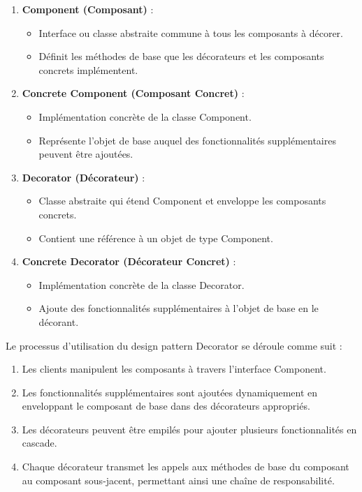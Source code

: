 \begin{enumerate}[leftmargin=*,labelsep=3mm]
    \item \textbf{Component (Composant)} :
    \begin{itemize}
        \item Interface ou classe abstraite commune à tous les composants à décorer.
        \item Définit les méthodes de base que les décorateurs et les composants concrets implémentent.
    \end{itemize}
    
    \item \textbf{Concrete Component (Composant Concret)} :
    \begin{itemize}
        \item Implémentation concrète de la classe Component.
        \item Représente l'objet de base auquel des fonctionnalités supplémentaires peuvent être ajoutées.
    \end{itemize}
    
    \item \textbf{Decorator (Décorateur)} :
    \begin{itemize}
        \item Classe abstraite qui étend Component et enveloppe les composants concrets.
        \item Contient une référence à un objet de type Component.
    \end{itemize}
    
    \item \textbf{Concrete Decorator (Décorateur Concret)} :
    \begin{itemize}
        \item Implémentation concrète de la classe Decorator.
        \item Ajoute des fonctionnalités supplémentaires à l'objet de base en le décorant.
    \end{itemize}
\end{enumerate}

Le processus d'utilisation du design pattern Decorator se déroule comme suit :

\begin{enumerate}[leftmargin=*,labelsep=3mm]
    \item Les clients manipulent les composants à travers l'interface Component.
    \item Les fonctionnalités supplémentaires sont ajoutées dynamiquement en enveloppant le composant de base dans des décorateurs appropriés.
    \item Les décorateurs peuvent être empilés pour ajouter plusieurs fonctionnalités en cascade.
    \item Chaque décorateur transmet les appels aux méthodes de base du composant au composant sous-jacent, permettant ainsi une chaîne de responsabilité.
\end{enumerate}

